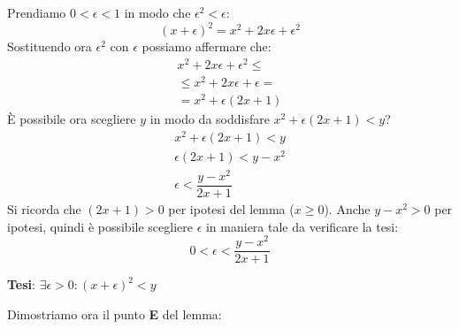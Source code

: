 {{        Prendiamo $0 < \epsilon < 1$ in modo che $\epsilon^2 < \epsilon$:
        \begin{equation*}
            (x+\epsilon)^2 = x^2 + 2x\epsilon + \epsilon^2
        \end{equation*}
        Sostituendo ora $\epsilon^2$ con $\epsilon$ possiamo affermare che:
        \begin{gather*}
            x^2 + 2x\epsilon + \epsilon^2 \leq\\
            \leq x^2 + 2x\epsilon + \epsilon =\\
            = x^2 + \epsilon(2x + 1)
        \end{gather*}
        È possibile ora scegliere $y$ in modo da soddisfare $x^2 + \epsilon(2x + 1) < y$?
        \begin{gather*}
            x^2 + \epsilon(2x + 1) < y\\
            \epsilon(2x + 1) < y - x^2\\
            \epsilon < \dfrac{y-x^2}{2x+1}
        \end{gather*}
        Si ricorda che $(2x+1) > 0$ per ipotesi del lemma ($x \geq 0$). Anche $y-x^2 > 0$ per ipotesi, quindi è possibile scegliere $\epsilon$ in maniera tale da verificare la tesi:
        \begin{equation*}
            0 < \epsilon < \dfrac{y-x^2}{2x+1}
        \end{equation*}
        
        \textbf{Tesi}: $\exists \epsilon > 0: (x+\epsilon)^2 < y$
    }
    Dimostriamo ora il punto \textbf{E} del lemma:
    }
